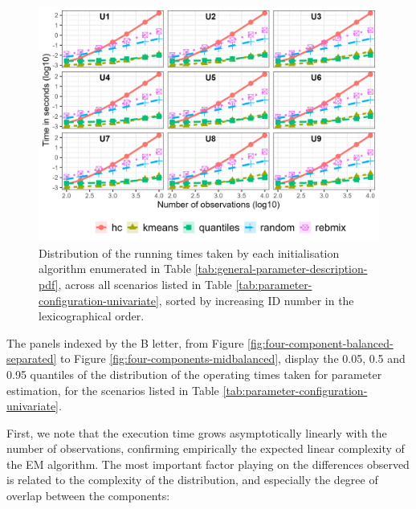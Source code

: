 \newpage
\begin{figure}

{\centering \includegraphics[width=1\linewidth]{./figs/univariate_initialisation_time_computations} 

}

\caption{Distribution of the running times taken by each initialisation algorithm enumerated in Table \ref{tab:general-parameter-description-pdf}, across all scenarios listed in Table \ref{tab:parameter-configuration-univariate}, sorted by increasing ID number in the lexicographical order.}\label{fig:univariate-initialisation-time-computations}
\end{figure}

The panels indexed by the B letter, from Figure
\ref{fig:four-component-balanced-separated} to Figure
\ref{fig:four-components-midbalanced}, display the 0.05, 0.5 and 0.95 quantiles of the distribution of the operating times
taken for parameter estimation, for the scenarios listed in Table \ref{tab:parameter-configuration-univariate}.

First, we note that the execution time grows asymptotically
linearly with the number of observations, confirming empirically the
expected linear complexity of the EM algorithm. The most important
factor playing on the differences observed is related to the complexity
of the distribution, and especially the degree of overlap between the
components:

